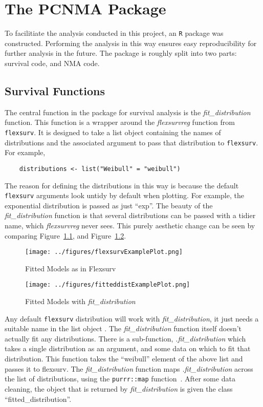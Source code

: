 \chapter{The PCNMA Package}\label{pack}

To facilitiate the analysis conducted in this project, an \verb|R| package was constructed. Performing the analysis in this way ensures easy reproducibility for further analysis in the future. The package is roughly split into two parts: survival code, and NMA code. 

\section{Survival Functions}
The central function in the package for survival analysis is the \textit{fit\_distribution} function. This function is a wrapper around the \textit{flexsurvreg} function from \verb|flexsurv|. It is designed to take a list object containing the names of distributions and the associated argument to pass that distribution to \verb|flexsurv|. For example, 

\begin{lstlisting}
    distributions <- list("Weibull" = "weibull")
\end{lstlisting}

The reason for defining the distributions in this way is because the default \verb|flexsurv| arguments look untidy by default when plotting. For example, the exponential distribution is passed as just ``exp''. The beauty of the \textit{fit\_distribution} function is that several distributions can be passed with a tidier name, which \textit{flexsurvreg} never sees. This purely aesthetic change can be seen by comparing Figure~\ref{fig:flexsurvlabelexample}, and Figure~\ref{fig:fitdistributionexampleplot}. \\

\begin{figure}[h]
    \texttt{[image: ../figures/flexsurvExamplePlot.png]}
    \caption{Fitted Models as in Flexsurv}
    \label{fig:flexsurvlabelexample}
\end{figure}

\begin{figure}[h]
    \texttt{[image: ../figures/fitteddistExamplePlot.png]}
    \caption{Fitted Models with \textit{fit\_distribution}}
    \label{fig:fitdistributionexampleplot}
\end{figure}

Any default \verb|flexsurv| distribution will work with \textit{fit\_distribution}, it just needs a suitable name in the list object . The \textit{fit\_distribution} function itself doesn't actually fit any distributions. There is a sub-function, \textit{.fit\_distribution} which takes a single distribution as an argument, and some data on which to fit that distribution. This function takes the ``weibull'' element of the above list and passes it to flexsurv. The \textit{fit\_distribution} function maps \textit{.fit\_distribution} across the list of distributions, using the \verb|purrr::map| function~\cite{purrr}. After some data cleaning, the object that is returned by \textit{fit\_distribution} is given the class ``fitted\_distribution''.  \\


